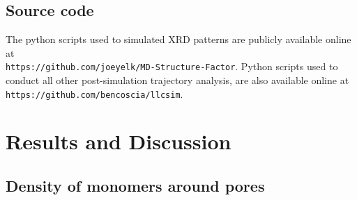 \documentclass[journal=jpcbfk,manuscript=article]{achemso}
\begin{document}
  \subsection{Source code}
  The python scripts used to simulated XRD patterns are publicly available online at \\
  \texttt{https://github.com/joeyelk/MD-Structure-Factor}. Python scripts used to conduct
  all other post-simulation trajectory analysis, are also available online at \\ 
  \texttt{https://github.com/bencoscia/llcsim}.
  
  \section{Results and Discussion}
  
  \subsection{Density of monomers around pores}\label{section:mon_per_pore}

%  
  
\end{document}
